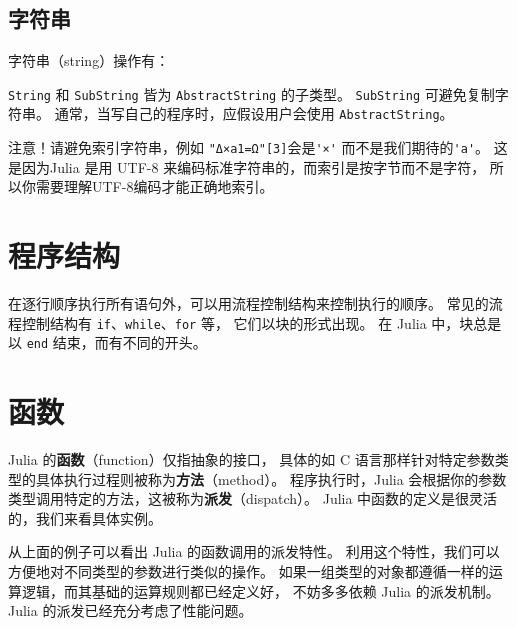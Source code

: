 \documentclass[10pt,a4paper]{article}
\begin{document}
\subsection{字符串}
字符串（string）操作有：


\lstinline|String| 和 \lstinline|SubString| 皆为 \lstinline|AbstractString| 的子类型。
\lstinline|SubString| 可避免复制字符串。
通常，当写自己的程序时，应假设用户会使用 \lstinline|AbstractString|。

注意！请避免索引字符串，例如 \lstinline|"Δ×a1=Ω"[3]|会是\lstinline|'×'| 而不是我们期待的\lstinline|'a'|。
这是因为Julia 是用 UTF-8 来编码标准字符串的，而索引是按字节而不是字符，
所以你需要理解UTF-8编码才能正确地索引。


\section{程序结构}

在逐行顺序执行所有语句外，可以用流程控制结构来控制执行的顺序。
常见的流程控制结构有 \lstinline|if|、\lstinline|while|、\lstinline|for| 等，
它们以块的形式出现。
在 Julia 中，块总是以 \lstinline|end| 结束，而有不同的开头。


\section{函数}
\label{sec:function}

Julia 的\textbf{函数}（function）仅指抽象的接口，
具体的如 C 语言那样针对特定参数类型的具体执行过程则被称为\textbf{方法}（method）。
程序执行时，Julia 会根据你的参数类型调用特定的方法，这被称为\textbf{派发}（dispatch）。
Julia 中函数的定义是很灵活的，我们来看具体实例。

从上面的例子可以看出 Julia 的函数调用的派发特性。
利用这个特性，我们可以方便地对不同类型的参数进行类似的操作。
如果一组类型的对象都遵循一样的运算逻辑，而其基础的运算规则都已经定义好，
不妨多多依赖 Julia 的派发机制。
Julia 的派发已经充分考虑了性能问题。

\end{document}
